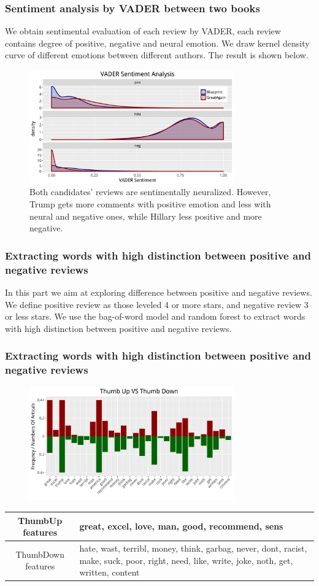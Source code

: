 \documentclass[9pt]{beamer}
\begin{document}
\begin{frame}
\frametitle{Sentiment analysis by VADER between two books}
We obtain sentimental evaluation of each review by VADER, each review contains degree of positive, negative and neural emotion. We draw kernel density curve of different emotions between different authors. The result is shown below.
\begin{figure}[H]
	\centering
	\includegraphics[width=250pt]{vader_density.pdf}
	\caption{Both candidates' reviews are sentimentally neuralized. However, Trump gets more comments with positive emotion and less with neural and negative ones, while Hillary less positive and more negative.}
\end{figure}
\end{frame}

\begin{frame}
\frametitle{Extracting words with high distinction between positive and negative reviews}
In this part we aim at exploring difference between positive and negative reviews. We define positive review as those leveled 4 or more stars, and negative review 3 or less stars. We use the bag-of-word model and random forest to extract words with high distinction between positive and negative reviews.
\end{frame}

\begin{frame}
\frametitle{Extracting words with high distinction between positive and negative reviews}
\begin{figure}[H]
	\centering
	\includegraphics[width=250pt]{bagofwords_great_bar.pdf}
\end{figure}
\begin{table}[H]
	\centering
	\begin{tabular}{cp{200pt}}
		\hline
		 ThumbUp features & great, excel, love, man, good, recommend, sens \\
		 \hline
		 ThumbDown features & hate, wast, terribl, money, think, garbag, never, dont, racist, make, suck, poor, right, need, like, write, joke, noth, get, written, content \\
		\hline
	\end{tabular}
\end{table}
\end{frame}
\end{document}
